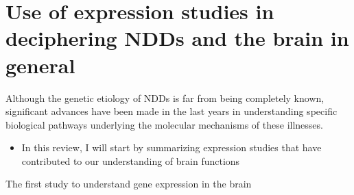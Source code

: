 \documentclass[12pt]{article}
\begin{document}
    \section{Use of expression studies in deciphering NDDs and the brain in general}
    Although the genetic etiology of NDDs is far from being completely known, significant advances have been made in the last years in understanding specific biological pathways underlying the molecular mechanisms of these illnesses. 
    \begin{itemize}
        \item In this review, I will start by summarizing expression studies that have contributed to our understanding of brain functions
    \end{itemize}

The first study to understand gene expression in the brain 
\end{document}
